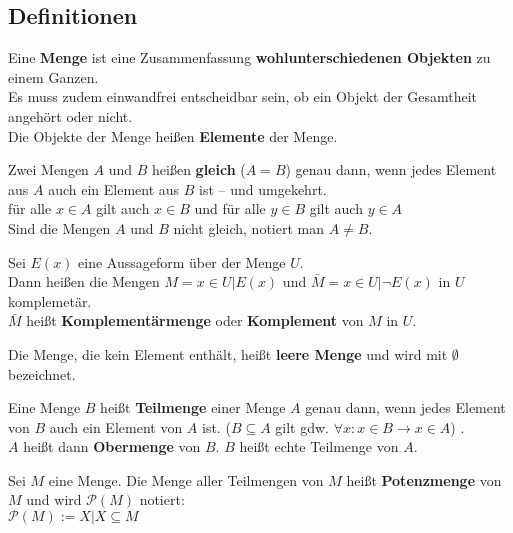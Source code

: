 \subsection*{Definitionen}

\begin{description}
  \setlength{\itemsep}{-.2cm}

  \item [Menge]
    Eine \textbf{Menge} ist eine Zusammenfassung 
    \textbf{wohlunterschiedenen Objekten} zu einem Ganzen.\\
    Es muss zudem einwandfrei entscheidbar sein, ob ein Objekt der Gesamtheit 
    angehört oder nicht.\\
    Die Objekte der Menge heißen \textbf{Elemente} der Menge.

  \item [gleichheit von Mengen:] 
    Zwei Mengen $A$ und $B$ heißen \textbf{gleich} ($A = B$) genau dann, wenn 
    jedes Element aus $A$ auch ein Element aus $B$ ist -- und umgekehrt.\\
    für alle $x \in A$ gilt auch $x \in B$ und für alle $y \in B$ gilt auch 
    $y \in A$ \\
    Sind die Mengen $A$ und $B$ nicht gleich, notiert man $A \neq B$.

  \item [Komplementärmenge:] 
    Sei $E(x)$ eine Aussageform über der Menge $U$.\\
    Dann heißen die Mengen 
    $M = {x \in U | E(x)}$ und $\bar{M} = {x \in U | \neg E(x)}$ in $U$ 
    komplemetär.\\
    $\bar{M}$ heißt \textbf{Komplementärmenge} oder \textbf{Komplement} von 
    $M$ in $U$.

  \item [Leere Menge:] 
    Die Menge, die kein Element enthält, heißt \textbf{leere Menge} und wird mit 
    $\emptyset$ bezeichnet.

  \item [Teilmenge:] 
    Eine Menge $B$ heißt \textbf{Teilmenge} einer Menge $A$ genau dann, wenn 
    jedes Element von $B$ auch ein Element von $A$ ist. ($B \subseteq A$ gilt 
    gdw. $\forall x : x \in B \rightarrow x \in A$) .\\
    $A$ heißt dann \textbf{Obermenge} von $B$. $B$ heißt echte Teilmenge von $A$.

  \item [Potenzmenge:] 
    Sei $M$ eine Menge. Die Menge aller Teilmengen von $M$ heißt 
    \textbf{Potenzmenge} von $M$ und wird $\mathcal{P}(M)$ notiert: \\
    $\mathcal{P}(M) := {X | X \subseteq M}$


\end{description}
